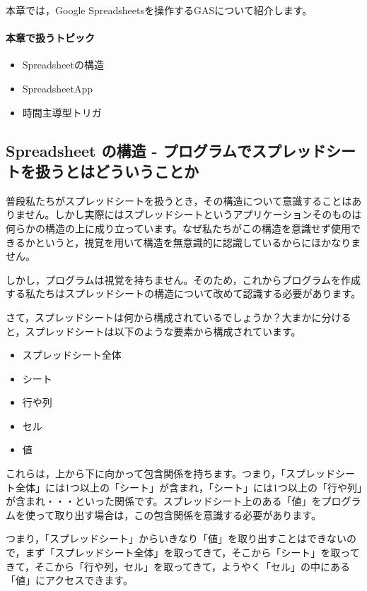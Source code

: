 \documentclass[uplatex,a4j]{jsarticle}
\begin{document}
本章では，Google Spreadsheetsを操作するGASについて紹介します。

\paragraph{本章で扱うトピック}
\begin{itemize}
\item Spreadsheetの構造
\item SpreadsheetApp
\item 時間主導型トリガ
\end{itemize}

\subsection{Spreadsheet の構造 - プログラムでスプレッドシートを扱うとはどういうことか}
\label{subsec:spreadsheet_structure}

普段私たちがスプレッドシートを扱うとき，その構造について意識することはありません。しかし実際にはスプレッドシートというアプリケーションそのものは何らかの構造の上に成り立っています。なぜ私たちがこの構造を意識せず使用できるかというと，視覚を用いて構造を無意識的に認識しているからにほかなりません。

しかし，プログラムは視覚を持ちません。そのため，これからプログラムを作成する私たちはスプレッドシートの構造について改めて認識する必要があります。

さて，スプレッドシートは何から構成されているでしょうか？大まかに分けると，スプレッドシートは以下のような要素から構成されています。

\begin{itemize}
\item スプレッドシート全体
\item シート
\item 行や列
\item セル
\item 値
\end{itemize}

これらは，上から下に向かって包含関係を持ちます。つまり，「スプレッドシート全体」には1つ以上の「シート」が含まれ，「シート」には1つ以上の「行や列」が含まれ・・・といった関係です。スプレッドシート上のある「値」をプログラムを使って取り出す場合は，この包含関係を意識する必要があります。

つまり，「スプレッドシート」からいきなり「値」を取り出すことはできないので，まず「スプレッドシート全体」を取ってきて，そこから「シート」を取ってきて，そこから「行や列，セル」を取ってきて，ようやく「セル」の中にある「値」にアクセスできます。
\end{document}
